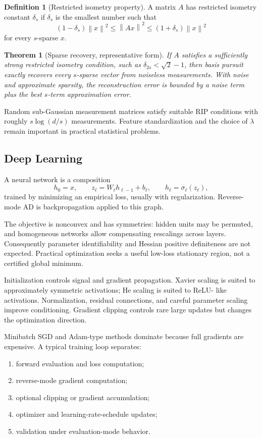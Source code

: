 \documentclass[12pt,oneside]{book}
\numberwithin{equation}{section}
\theoremstyle{definition}
\newtheorem{definition}{Definition}[section]
\theoremstyle{plain}
\newtheorem{theorem}{Theorem}[section]
\theoremstyle{remark}
\newcommand{\norm}[1]{\left\lVert #1 \right\rVert}
\begin{document}
\begin{definition}[Restricted isometry property]
A matrix $A$ has restricted isometry constant $\delta_s$ if $\delta_s$ is the
smallest number such that
\[
 (1-\delta_s)\norm x^2\leq\norm{Ax}^2
 \leq(1+\delta_s)\norm x^2
\]
for every $s$-sparse $x$.
\end{definition}

\begin{theorem}[Sparse recovery, representative form]
If $A$ satisfies a sufficiently strong restricted isometry condition, such as
$\delta_{2s}<\sqrt2-1$, then basis pursuit exactly recovers every $s$-sparse
vector from noiseless measurements. With noise and approximate sparsity, the
reconstruction error is bounded by a noise term plus the best $s$-term
approximation error.
\end{theorem}

Random sub-Gaussian measurement matrices satisfy suitable RIP conditions with
roughly $s\log(d/s)$ measurements. Feature standardization and the choice of
$\lambda$ remain important in practical statistical problems.

\subsection{Deep Learning}

A neural network is a composition
\[
 h_0=x,\qquad
 z_\ell=W_\ell h_{\ell-1}+b_\ell,\qquad
 h_\ell=\sigma_\ell(z_\ell),
\]
trained by minimizing an empirical loss, usually with regularization. Reverse-
mode AD is backpropagation applied to this graph.

The objective is nonconvex and has symmetries: hidden units may be permuted,
and homogeneous networks allow compensating rescalings across layers.
Consequently parameter identifiability and Hessian positive definiteness are
not expected. Practical optimization seeks a useful low-loss stationary
region, not a certified global minimum.

Initialization controls signal and gradient propagation. Xavier scaling is
suited to approximately symmetric activations; He scaling is suited to ReLU-
like activations. Normalization, residual connections, and careful parameter
scaling improve conditioning. Gradient clipping controls rare large updates
but changes the optimization direction.

Minibatch SGD and Adam-type methods dominate because full gradients are
expensive. A typical training loop separates:
\begin{enumerate}
 \item forward evaluation and loss computation;
 \item reverse-mode gradient computation;
 \item optional clipping or gradient accumulation;
 \item optimizer and learning-rate-schedule updates;
 \item validation under evaluation-mode behavior.
\end{enumerate}
\end{document}
